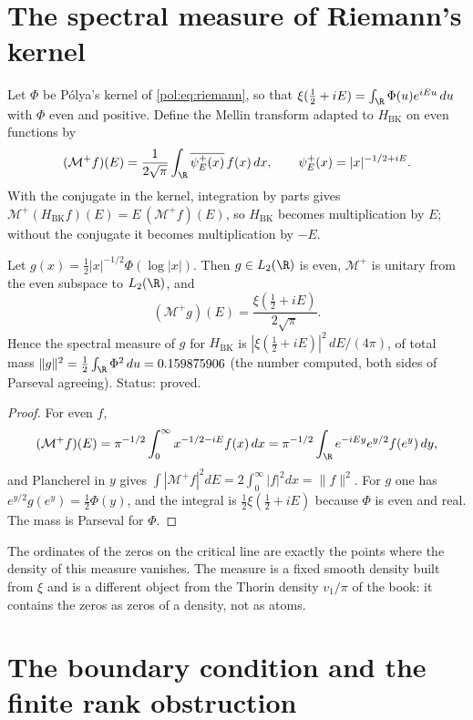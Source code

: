 \section{The spectral measure of Riemann's kernel}\label{bk:sec:mellin}

Let $\Phi$ be P\'olya's kernel of \eqref{pol:eq:riemann}, so that $\xi(\frac12+iE)=\int_\R\Phi(u)e^{iEu}\,du$ with $\Phi$ even and positive. Define the Mellin transform adapted to $H_{\mathrm{BK}}$ on even functions by
\[
(\mathcal M^+f)(E)=\frac1{2\sqrt\pi}\int_\R\overline{\psi_E^+(x)}\,f(x)\,dx,\qquad \psi_E^+(x)=|x|^{-1/2+iE}.
\]
With the conjugate in the kernel, integration by parts gives $\mathcal M^+(H_{\mathrm{BK}}f)(E)=E\,(\mathcal M^+f)(E)$, so $H_{\mathrm{BK}}$ becomes multiplication by $E$; without the conjugate it becomes multiplication by $-E$.

\begin{proposition}\label{bk:prop:mellin}
Let $g(x)=\frac12|x|^{-1/2}\Phi(\log|x|)$. Then $g\in L_2(\R)$ is even, $\mathcal M^+$ is unitary from the even subspace to $L_2(\R)$, and
\[
(\mathcal M^+g)(E)=\frac{\xi(\frac12+iE)}{2\sqrt\pi}.
\]
Hence the spectral measure of $g$ for $H_{\mathrm{BK}}$ is $|\xi(\frac12+iE)|^2\,dE/(4\pi)$, of total mass $\|g\|^2=\frac12\int_\R\Phi^2\,du=0.159875906$ (the number computed, both sides of Parseval agreeing). Status: proved.
\end{proposition}

\begin{proof}
For even $f$,
\[
(\mathcal M^+f)(E)=\pi^{-1/2}\int_0^\infty x^{-1/2-iE}f(x)\,dx=\pi^{-1/2}\int_\R e^{-iEy}e^{y/2}f(e^y)\,dy,
\]
and Plancherel in $y$ gives $\int|\mathcal M^+f|^2dE=2\int_0^\infty|f|^2dx=\|f\|^2$. For $g$ one has $e^{y/2}g(e^y)=\frac12\Phi(y)$, and the integral is $\frac12\xi(\frac12+iE)$ because $\Phi$ is even and real. The mass is Parseval for $\Phi$.
\end{proof}

The ordinates of the zeros on the critical line are exactly the points where the density of this measure vanishes. The measure is a fixed smooth density built from $\xi$ and is a different object from the Thorin density $v_1/\pi$ of the book: it contains the zeros as zeros of a density, not as atoms.

\section{The boundary condition and the finite rank obstruction}\label{bk:sec:nogo}

